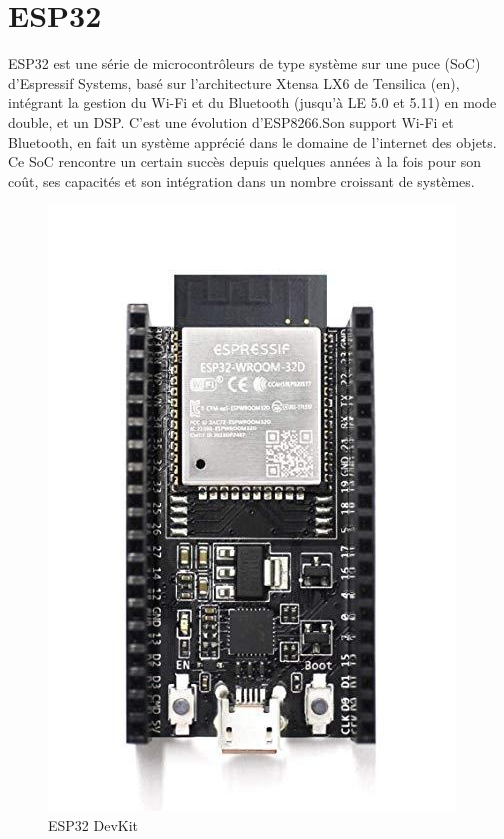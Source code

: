 \section{ESP32}
    ESP32 est une série de microcontrôleurs de type système sur une puce (SoC) d’Espressif Systems, basé sur l’architecture Xtensa LX6 de Tensilica (en), intégrant la gestion du Wi-Fi et du Bluetooth (jusqu’à LE 5.0 et 5.11) en mode double, et un DSP. C’est une évolution d’ESP8266.Son support Wi-Fi et Bluetooth, en fait un système apprécié dans le domaine de l’internet des objets. Ce SoC rencontre un certain succès depuis quelques années à la fois pour son coût, ses capacités et son intégration dans un nombre croissant de systèmes.\cite{32}
    \begin{figure}[h!]
                 \centering
                \includegraphics[scale=0.30]{images/esp32.jpg}
                 \caption{ESP32 DevKit}
                 \label{fig49}
    \end{figure}
